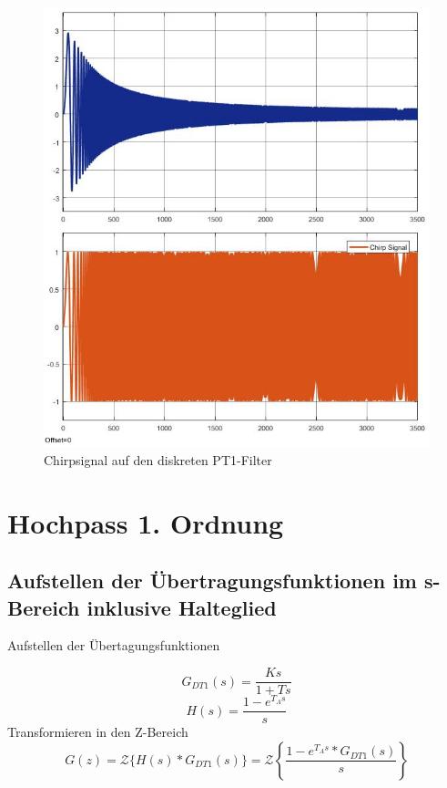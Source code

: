 \documentclass[12pt,a4paper]{report}
\begin{document}
\begin{figure}[ht]
\centering
\includegraphics[width=0.9\linewidth]{marius/PT1_Chirp_0,0001-1Hz}
\caption{Chirpsignal auf den diskreten PT1-Filter}
\label{fig:PT1_Chirp}
\end{figure}




\chapter{Hochpass 1. Ordnung}
\section{Aufstellen der Übertragungsfunktionen im s-Bereich inklusive Halteglied}
Aufstellen der Übertagungsfunktionen

\begin{equation}
G_{DT1}(s) = \frac{Ks}{1+Ts} 
\end{equation}
\begin{equation}
H(s) = \frac{1-e^{T_As}}{s}
\end{equation}
Transformieren in den Z-Bereich
\begin{equation}
G(z) = \mathcal{Z}\{H(s)*G_{DT1}(s)\} = \mathcal{Z}\left\{\frac{1-e^{T_As}* G_{DT1}(s)}{s}\right\}
\end{equation}
\end{document}
